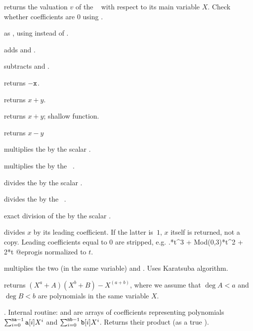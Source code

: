  returns the valuation $v$ of the
~ with respect to its main variable $X$. Check whether
coefficients are $0$ using .

 as , using
 instead of .


 adds  and .

 subtracts  and .

 returns $-{\tt x}$.

 returns $x+y$.

 returns $x+y$; shallow function.


 returns $x-y$

 multiplies the  
by the scalar .

 multiplies the  
by the ~.

 divides the  
by the scalar .

 divides the  
by the ~.

 exact division of the 
 by the scalar .

 divides $x$ by its
leading coefficient. If the latter is~$1$, $x$ itself is returned, not a
copy. Leading coefficients equal to $0$ are stripped, e.g.
.*t^3 + Mod(0,3)*t^2 + 2*t
@eprog\noindent is normalized to $t$.

 multiplies the two  (in the same
variable)  and . Uses Karatsuba algorithm.

returns $(X^a + A)(X^b + B) - X^(a+b)$, where we assume that $\deg A < a$
and $\deg B < b$ are polynomials in the same variable $X$.

. Internal routine:
 and  are arrays of coefficients representing polynomials
$\sum_{i = 0}^{{\tt na-1}} {\tt a}[i] X^i$ and
$\sum_{i = 0}^{{\tt nb-1}} {\tt b}[i] X^i$. Returns their product (as a true
).

